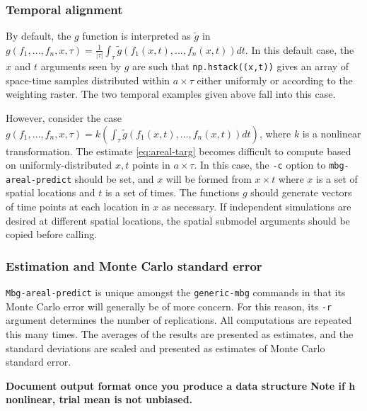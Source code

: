 \subsubsection{Temporal alignment}
By default, the $g$ function is interpreted as $\tilde g$ in $g(f_1,\ldots,f_n,x,\tau)=\frac{1}{|\tau|}\int_\tau \tilde g(f_1(x,t),\ldots,f_n(x,t))dt$. In this default case, the $x$ and $t$ arguments seen by $g$ are such that \texttt{np.hstack((x,t))} gives an array of space-time samples distributed within $a\times\tau$ either uniformly or according to the weighting raster. The two temporal examples given above fall into this case.

However, consider the case $g(f_1,\ldots,f_n,x,\tau)=k(\int_\tau\tilde g(f_1(x,t),\ldots,f_n(x,t))dt)$, where $k$ is a nonlinear transformation. The estimate \ref{eq:areal-targ} becomes difficult to compute based on uniformly-distributed $x,t$ points in $a\times \tau$. In this case, the \texttt{-c} option to \texttt{mbg-areal-predict} should be set, and $x$ will be formed from $x\times t$ where $x$ is a set of spatial locations and $t$ is a set of times. The functions $g$ should generate vectors of time points at each location in $x$ as necessary. If independent simulations are desired at different spatial locations, the spatial submodel arguments should be copied before calling.

\subsubsection{Estimation and Monte Carlo standard error}
\texttt{Mbg-areal-predict} is unique amongst the \texttt{generic-mbg} commands in that its Monte Carlo error will generally be of more concern. For this reason, its \texttt{-r} argument determines the number of replications. All computations are repeated this many times. The averages of the results are presented as estimates, and the standard deviations are scaled and presented as estimates of Monte Carlo standard error.

\textbf{Document output format once you produce a data structure}
\textbf{Note if h nonlinear, trial mean is not unbiased.}



